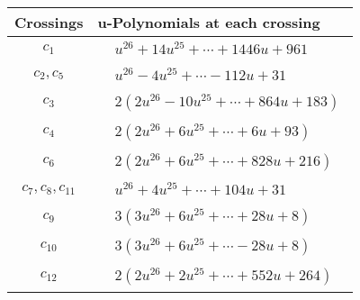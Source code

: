\documentclass[1p]{elsarticle_modified}
\theoremstyle{definition}
\begin{document}
\begin{tabular}{m{50pt}|m{274pt}}
Crossings & \hspace{64pt}u-Polynomials at each crossing \\
\hline $$\begin{aligned}c_{1}\end{aligned}$$&$\begin{aligned}
&u^{26}+14 u^{25}+\cdots+1446 u+961
\end{aligned}$\\
\hline $$\begin{aligned}c_{2},c_{5}\end{aligned}$$&$\begin{aligned}
&u^{26}-4 u^{25}+\cdots-112 u+31
\end{aligned}$\\
\hline $$\begin{aligned}c_{3}\end{aligned}$$&$\begin{aligned}
&2(2 u^{26}-10 u^{25}+\cdots+864 u+183)
\end{aligned}$\\
\hline $$\begin{aligned}c_{4}\end{aligned}$$&$\begin{aligned}
&2(2 u^{26}+6 u^{25}+\cdots+6 u+93)
\end{aligned}$\\
\hline $$\begin{aligned}c_{6}\end{aligned}$$&$\begin{aligned}
&2(2 u^{26}+6 u^{25}+\cdots+828 u+216)
\end{aligned}$\\
\hline $$\begin{aligned}c_{7},c_{8},c_{11}\end{aligned}$$&$\begin{aligned}
&u^{26}+4 u^{25}+\cdots+104 u+31
\end{aligned}$\\
\hline $$\begin{aligned}c_{9}\end{aligned}$$&$\begin{aligned}
&3(3 u^{26}+6 u^{25}+\cdots+28 u+8)
\end{aligned}$\\
\hline $$\begin{aligned}c_{10}\end{aligned}$$&$\begin{aligned}
&3(3 u^{26}+6 u^{25}+\cdots-28 u+8)
\end{aligned}$\\
\hline $$\begin{aligned}c_{12}\end{aligned}$$&$\begin{aligned}
&2(2 u^{26}+2 u^{25}+\cdots+552 u+264)
\end{aligned}$\\
\hline
\end{tabular}\\~\\
\end{document}
